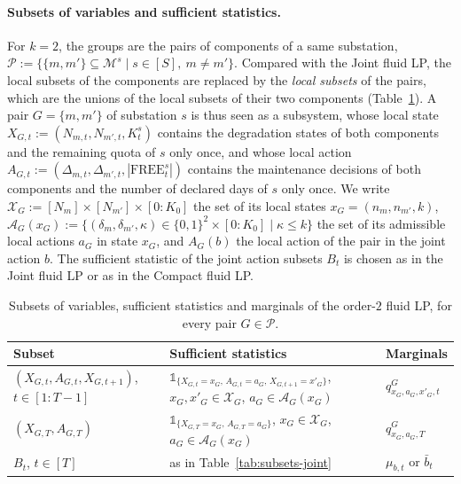 \documentclass{article}
\begin{document}
\paragraph{Subsets of variables and sufficient statistics.} For $k = 2$, the groups are the pairs of components of a
same substation, $\mathcal{P} := \big\{ \{m, m'\} \subseteq \mathcal{M}^s \mid s \in [S],\ m \neq m' \big\}$.
Compared with the Joint fluid LP, the local subsets of the components are replaced by the \emph{local subsets} of the
pairs, which are the unions of the local subsets of their two components (Table~\ref{tab:subsets-order-2}). A pair $G
= \{m, m'\}$ of substation $s$ is thus seen as a subsystem, whose local state $X_{G,t} := (N_{m,t}, N_{m',t}, K^s_t)$
contains the degradation states of both components and the remaining quota of $s$ only once, and whose local action
$A_{G,t} := (\Delta_{m,t}, \Delta_{m',t}, |\text{FREE}^s_t|)$ contains the maintenance decisions of both components and
the number of declared days of $s$ only once. We write $\mathcal{X}_G := [N_m] \times [N_{m'}] \times [0:K_0]$ the set
of its local states $x_G = (n_m, n_{m'}, k)$, $\mathcal{A}_G(x_G) := \{ (\delta_m, \delta_{m'}, \kappa) \in \{0,1\}^2
\times [0:K_0] \mid \kappa \le k \}$ the set of its admissible local actions $a_G$ in state $x_G$, and $A_G(b)$ the
local action of the pair in the joint action $b$. The sufficient statistic of the joint action subsets $B_t$ is chosen
as in the Joint fluid LP or as in the Compact fluid LP.

\begin{table}[h]
\centering
\small
\renewcommand{\arraystretch}{1.3}
\begin{tabular}{|l|l|l|}
\hline
Subset & Sufficient statistics & Marginals \\
\hline
$(X_{G,t}, A_{G,t}, X_{G,t+1})$, $t \in [1:T-1]$ & $\mathds{1}_{\{X_{G,t} = x_G,\, A_{G,t} = a_G,\, X_{G,t+1} =
x'_G\}}$, $x_G, x'_G \in \mathcal{X}_G$, $a_G \in \mathcal{A}_G(x_G)$ & $q^G_{x_G,a_G,x'_G,t}$ \\
$(X_{G,T}, A_{G,T})$ & $\mathds{1}_{\{X_{G,T} = x_G,\, A_{G,T} = a_G\}}$, $x_G \in \mathcal{X}_G$, $a_G \in
\mathcal{A}_G(x_G)$ & $q^G_{x_G,a_G,T}$ \\
$B_t$, $t \in [T]$ & as in Table~\ref{tab:subsets-joint} & $\mu_{b,t}$ or $\bar
b_t$ \\
\hline
\end{tabular}
\caption{Subsets of variables, sufficient statistics and marginals of the order-$2$ fluid LP, for every pair $G \in
\mathcal{P}$.}
\label{tab:subsets-order-2}
\end{table}
\end{document}
